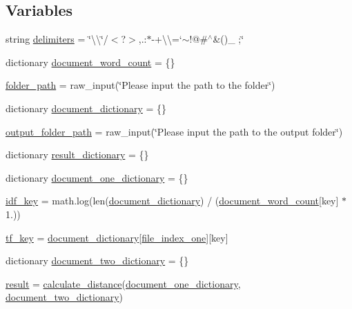 \subsection*{Variables}
\begin{DoxyCompactItemize}
\item 
string \hyperlink{namespacediff_a46e2544bf0f797b8d42f4985d4b9bf0a}{delimiters} = \char`\"{}\textbackslash{}\textquotesingle{}\textbackslash{}\char`\"{}/$<$?$>$,.\+:$\ast$-\/+\textbackslash{}\textbackslash{}=`$\sim$!@\#$^\wedge$\&()\+\_\+ ;\char`\"{}
\item 
dictionary \hyperlink{namespacediff_af16edaaafe4787892cb925870fd0d108}{document\+\_\+word\+\_\+count} = \{\}
\item 
\hyperlink{namespacediff_adccd64c100d50ed0e87d46c33e8636eb}{folder\+\_\+path} = raw\+\_\+input(\char`\"{}Please input the path to the folder\char`\"{})
\item 
dictionary \hyperlink{namespacediff_a7d02a567fcd601900d3960bef0191cea}{document\+\_\+dictionary} = \{\}
\item 
\hyperlink{namespacediff_aed454348ccff9ceb835a6c22de15fa95}{output\+\_\+folder\+\_\+path} = raw\+\_\+input(\char`\"{}Please input the path to the output folder\char`\"{})
\item 
dictionary \hyperlink{namespacediff_a08d29f91abd1bc75aa7d8ecb3aa39c91}{result\+\_\+dictionary} = \{\}
\item 
dictionary \hyperlink{namespacediff_adb8493e93ac22af9aef08d29989bc40d}{document\+\_\+one\+\_\+dictionary} = \{\}
\item 
\hyperlink{namespacediff_a1798972d3d6361a79c16d8470bf3471d}{idf\+\_\+key} = math.\+log(len(\hyperlink{namespacediff_a7d02a567fcd601900d3960bef0191cea}{document\+\_\+dictionary}) / (\hyperlink{namespacediff_af16edaaafe4787892cb925870fd0d108}{document\+\_\+word\+\_\+count}\mbox{[}key\mbox{]} $\ast$ 1.))
\item 
\hyperlink{namespacediff_ab860e167471d632882c770f12e87927e}{tf\+\_\+key} = \hyperlink{namespacediff_a7d02a567fcd601900d3960bef0191cea}{document\+\_\+dictionary}\mbox{[}\hyperlink{namespacediff_ac8ee8a35e457d5004c0f85b0383faf26}{file\+\_\+index\+\_\+one}\mbox{]}\mbox{[}key\mbox{]}
\item 
dictionary \hyperlink{namespacediff_ad928e1eb5cb7ebde52f495bf99c78a3b}{document\+\_\+two\+\_\+dictionary} = \{\}
\item 
\hyperlink{namespacediff_a5df2e8041c6fff30558b49edee35438a}{result} = \hyperlink{namespacediff_a0b1fc82894743728455b31d3e9ec3671}{calculate\+\_\+distance}(\hyperlink{namespacediff_adb8493e93ac22af9aef08d29989bc40d}{document\+\_\+one\+\_\+dictionary}, \hyperlink{namespacediff_ad928e1eb5cb7ebde52f495bf99c78a3b}{document\+\_\+two\+\_\+dictionary})

\end{DoxyCompactItemize}
